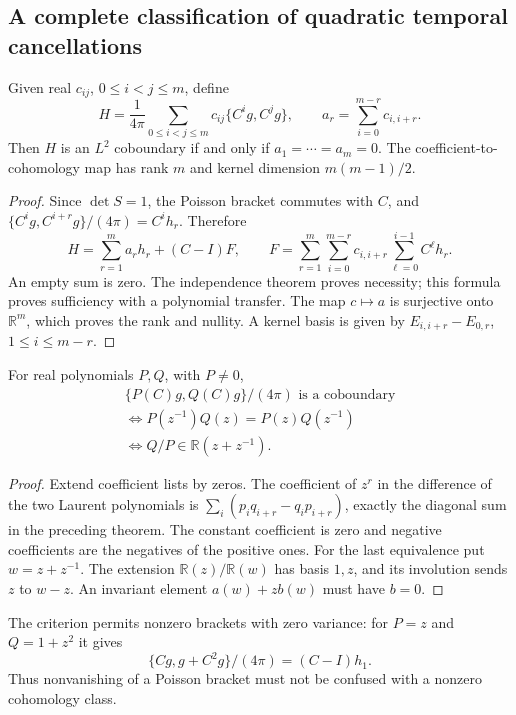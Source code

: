 \subsection{A complete classification of quadratic temporal cancellations}
\begin{theorem}\label{thm:temporal-cancellation}
Given real $c_{ij}$, $0\le i<j\le m$, define
\[
 H=\frac1{4\pi}\sum_{0\le i<j\le m}c_{ij}\{C^ig,C^jg\},
 \qquad a_r=\sum_{i=0}^{m-r}c_{i,i+r}.
\]
Then $H$ is an $L^2$ coboundary if and only if $a_1=\cdots=a_m=0$.
The coefficient-to-cohomology map has rank $m$ and kernel dimension
$m(m-1)/2$.
\end{theorem}
\begin{proof}
Since $\det S=1$, the Poisson bracket commutes with $C$, and
$\{C^ig,C^{i+r}g\}/(4\pi)=C^ih_r$. Therefore
\[
 H=\sum_{r=1}^m a_rh_r+(C-I)F,\qquad
 F=\sum_{r=1}^m\sum_{i=0}^{m-r}c_{i,i+r}
                      \sum_{\ell=0}^{i-1}C^\ell h_r.
\]
An empty sum is zero. The independence theorem proves necessity; this formula
proves sufficiency with a polynomial transfer. The map $c\mapsto a$ is
surjective onto $\mathbb R^m$, which proves the rank and nullity. A kernel
basis is given by $E_{i,i+r}-E_{0,r}$, $1\le i\le m-r$.
\end{proof}

\begin{corollary}\label{cor:temporal-filters}
For real polynomials $P,Q$, with $P\ne0$,
\[
 \begin{gathered}
 \{P(C)g,Q(C)g\}/(4\pi)\text{ is a coboundary}\\
 \Longleftrightarrow P(z^{-1})Q(z)=P(z)Q(z^{-1})\\
 \Longleftrightarrow Q/P\in\mathbb R(z+z^{-1}).
 \end{gathered}
\]
\end{corollary}
\begin{proof}
Extend coefficient lists by zeros. The coefficient of $z^r$ in the difference
of the two Laurent polynomials is
$\sum_i(p_iq_{i+r}-q_ip_{i+r})$, exactly the diagonal sum in the preceding
theorem. The constant coefficient is zero and negative coefficients are the
negatives of the positive ones. For the last equivalence put $w=z+z^{-1}$.
The extension $\mathbb R(z)/\mathbb R(w)$ has basis $1,z$, and its involution
sends $z$ to $w-z$. An invariant element $a(w)+zb(w)$ must have $b=0$.
\end{proof}

The criterion permits nonzero brackets with zero variance: for $P=z$ and
$Q=1+z^2$ it gives
\[
 \{Cg,g+C^2g\}/(4\pi)=(C-I)h_1.
\]
Thus nonvanishing of a Poisson bracket must not be confused with a nonzero
cohomology class.

